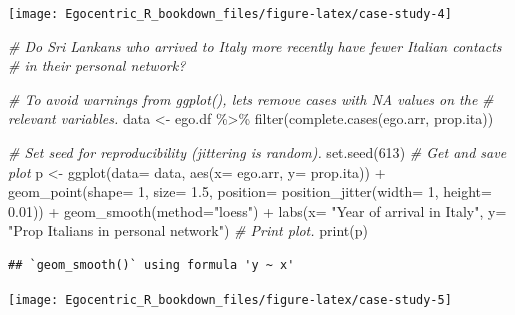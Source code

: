 \documentclass[
]{book}
\newenvironment{Shaded}{\begin{snugshade}}{\end{snugshade}}
\newcommand{\AttributeTok}[1]{\textcolor[rgb]{0.77,0.63,0.00}{#1}}
\newcommand{\CommentTok}[1]{\textcolor[rgb]{0.56,0.35,0.01}{\textit{#1}}}
\newcommand{\DecValTok}[1]{\textcolor[rgb]{0.00,0.00,0.81}{#1}}
\newcommand{\FloatTok}[1]{\textcolor[rgb]{0.00,0.00,0.81}{#1}}
\newcommand{\FunctionTok}[1]{\textcolor[rgb]{0.00,0.00,0.00}{#1}}
\newcommand{\NormalTok}[1]{#1}
\newcommand{\OtherTok}[1]{\textcolor[rgb]{0.56,0.35,0.01}{#1}}
\newcommand{\SpecialCharTok}[1]{\textcolor[rgb]{0.00,0.00,0.00}{#1}}
\newcommand{\StringTok}[1]{\textcolor[rgb]{0.31,0.60,0.02}{#1}}
\begin{document}
\texttt{[image: Egocentric\_R\_bookdown\_files/figure-latex/case-study-4]}

\begin{Shaded}
\begin{Highlighting}[]
\CommentTok{\# Do Sri Lankans who arrived to Italy more recently have fewer Italian contacts}
\CommentTok{\# in their personal network?}

\CommentTok{\# To avoid warnings from ggplot(), let\textquotesingle{}s remove cases with NA values on the}
\CommentTok{\# relevant variables.}
\NormalTok{data }\OtherTok{\textless{}{-}}\NormalTok{ ego.df }\SpecialCharTok{\%\textgreater{}\%}
  \FunctionTok{filter}\NormalTok{(}\FunctionTok{complete.cases}\NormalTok{(ego.arr, prop.ita))}

\CommentTok{\# Set seed for reproducibility (jittering is random).}
\FunctionTok{set.seed}\NormalTok{(}\DecValTok{613}\NormalTok{)}
\CommentTok{\# Get and save plot}
\NormalTok{p }\OtherTok{\textless{}{-}} \FunctionTok{ggplot}\NormalTok{(}\AttributeTok{data=}\NormalTok{ data, }\FunctionTok{aes}\NormalTok{(}\AttributeTok{x=}\NormalTok{ ego.arr, }\AttributeTok{y=}\NormalTok{ prop.ita)) }\SpecialCharTok{+} 
  \FunctionTok{geom\_point}\NormalTok{(}\AttributeTok{shape=} \DecValTok{1}\NormalTok{, }\AttributeTok{size=} \FloatTok{1.5}\NormalTok{, }\AttributeTok{position=} \FunctionTok{position\_jitter}\NormalTok{(}\AttributeTok{width=} \DecValTok{1}\NormalTok{, }\AttributeTok{height=} \FloatTok{0.01}\NormalTok{)) }\SpecialCharTok{+} 
  \FunctionTok{geom\_smooth}\NormalTok{(}\AttributeTok{method=}\StringTok{"loess"}\NormalTok{) }\SpecialCharTok{+} 
  \FunctionTok{labs}\NormalTok{(}\AttributeTok{x=} \StringTok{"Year of arrival in Italy"}\NormalTok{, }\AttributeTok{y=} \StringTok{"Prop Italians in personal network"}\NormalTok{)}
\CommentTok{\# Print plot.}
\FunctionTok{print}\NormalTok{(p)}
\end{Highlighting}
\end{Shaded}

\begin{verbatim}
## `geom_smooth()` using formula 'y ~ x'
\end{verbatim}

\texttt{[image: Egocentric\_R\_bookdown\_files/figure-latex/case-study-5]}
\end{document}
